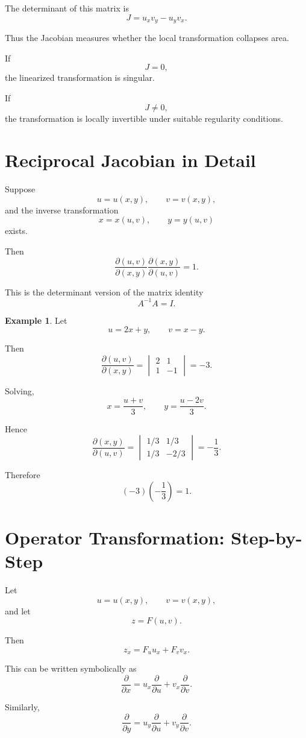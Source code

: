 \documentclass[11pt,oneside]{book}
\theoremstyle{studentthm}
\theoremstyle{definition}
\newtheorem{example}[theorem]{Example}
\begin{document}
The determinant of this matrix is
\[
J
=
u_xv_y-u_yv_x.
\]

Thus the Jacobian measures whether the local transformation collapses
area.

If
\[
J=0,
\]
the linearized transformation is singular.

If
\[
J\ne0,
\]
the transformation is locally invertible under suitable regularity
conditions.

\section{Reciprocal Jacobian in Detail}

Suppose
\[
u=u(x,y),
\qquad
v=v(x,y),
\]
and the inverse transformation
\[
x=x(u,v),
\qquad
y=y(u,v)
\]
exists.

Then
\[
\frac{\partial(u,v)}{\partial(x,y)}
\frac{\partial(x,y)}{\partial(u,v)}
=1.
\]

This is the determinant version of the matrix identity
\[
A^{-1}A=I.
\]

\begin{example}
Let
\[
u=2x+y,
\qquad
v=x-y.
\]

Then
\[
\frac{\partial(u,v)}{\partial(x,y)}
=
\begin{vmatrix}
2&1\\
1&-1
\end{vmatrix}
=-3.
\]

Solving,
\[
x=\frac{u+v}{3},
\qquad
y=\frac{u-2v}{3}.
\]

Hence
\[
\frac{\partial(x,y)}{\partial(u,v)}
=
\begin{vmatrix}
1/3&1/3\\
1/3&-2/3
\end{vmatrix}
=
-\frac13.
\]

Therefore
\[
(-3)\left(-\frac13\right)=1.
\]
\end{example}

\section{Operator Transformation: Step-by-Step}

Let
\[
u=u(x,y),
\qquad
v=v(x,y),
\]
and let
\[
z=F(u,v).
\]

Then
\[
z_x
=
F_u u_x+F_v v_x.
\]

This can be written symbolically as
\[
\frac{\partial}{\partial x}
=
u_x\frac{\partial}{\partial u}
+
v_x\frac{\partial}{\partial v}.
\]

Similarly,
\[
\frac{\partial}{\partial y}
=
u_y\frac{\partial}{\partial u}
+
v_y\frac{\partial}{\partial v}.
\]
\end{document}
